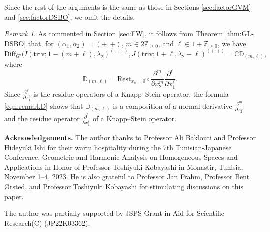 \documentclass[reqno,11pt]{amsart}
\theoremstyle{remark}
\newtheorem{rem}[equation]{Remark}
\theoremstyle{definition}
\numberwithin{equation}{section}
\newcommand{\ga}{\alpha}
\newcommand{\C}{\mathbb{C}}
\newcommand{\Z}{\mathbb{Z}}
\newcommand{\Diff}{\mathrm{Diff}}
\newcommand{\triv}{\mathrm{triv}}
\newcommand{\Rest}{\mathrm{Rest}}
\newcommand{\bD}{\mathbb{D}}
\begin{document}
Since the rest of the arguments is the same as those in Sections \ref{sec:factorGVM} and 
\ref{sec:factorDSBO}, we omit the details.

\begin{rem}\label{rem:FW2}
As commented in Section \ref{sec:FW}, 
it follows from Theorem \ref{thm:GL-DSBO} that,
 for $(\ga_1, \ga_2)=(+, +)$, 
$m \in 2\Z_{\geq 0}$, and $\ell \in 1+\Z_{\geq 0}$, 
we have
\begin{equation*}
\Diff_{G'}(I(\triv;1-(m+\ell),\lambda_2)^{(+,+)}, J(\triv; 1+\ell, \lambda_2-\ell)^{(+,+)}
=\C\bD_{(m,\ell)},
\end{equation*}
where
\begin{equation}\label{eqn:remarkD}
\bD_{(m,\ell)} = \Rest_{x_n=0} \circ
\frac{\partial^m}{\partial x_2^m}\frac{\partial^\ell}{\partial x_1^\ell}.
\end{equation}
Since
$\frac{\partial^\ell}{\partial x_1^\ell}$ is the residue operators 
of a Knapp--Stein operator, 
the formula \eqref{eqn:remarkD} shows that 
$\bD_{(m,\ell)}$ is a composition of
a normal derivative $\frac{\partial^m}{\partial x_2^m}$
and the residue operator $\frac{\partial^\ell}{\partial x_1^\ell}$
of a Knapp--Stein operator.
\end{rem}


\vspace{5pt}

\noindent
\textbf{Acknowledgements.}
The author thanks to Professor Ali Baklouti  and Professor Hideyuki Ishi for their warm hospitality during the 7th Tunisian-Japanese Conference,
Geometric and Harmonic Analysis on Homogeneous Spaces  and 
Applications in Honor of Professor Toshiyuki Kobayashi
in Monastir, Tunisia, November 1--4, 2023.
He is also grateful to Professor Jan Frahm, Professor Bent {\O}rsted, and Professor Toshiyuki Kobayashi for stimulating discussions on this paper.

The author was partially supported by JSPS
Grant-in-Aid for Scientific Research(C) (JP22K03362).


%
%
\end{document}
